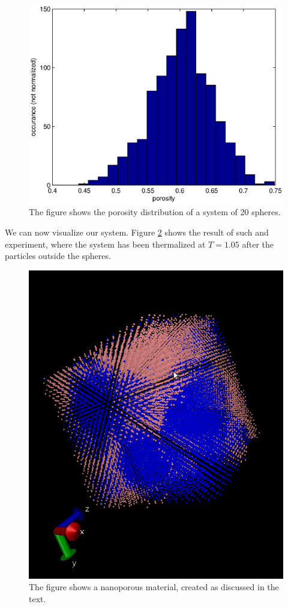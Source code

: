 \documentclass[12pt]{article}
\begin{document}
   \begin{figure}
  \centering
  \includegraphics[width=12cm]{porosity.eps}
\caption{\label{fig:3} The figure shows the porosity distribution of a system of 20 spheres.}
 \end{figure} 
 
 We can now visualize our system. Figure \ref{fig:4} shows the result of such and experiment, where the system has been thermalized at $T = 1.05$ after the particles outside the spheres.
 
    \begin{figure}
  \centering
  \includegraphics[width=12cm]{nanopores.png}
\caption{\label{fig:4} The figure shows a nanoporous material, created as discussed in the text.}
 \end{figure} 
 
\end{document}

